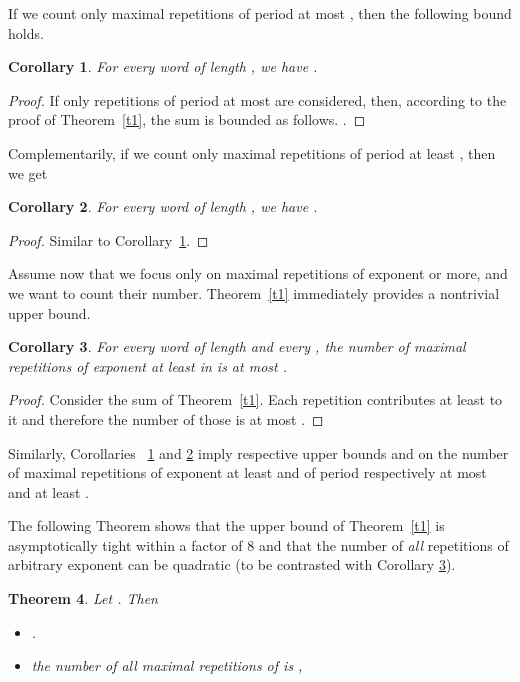\documentclass[11pt]{article}
\newtheorem{theorem}{Theorem}
\newtheorem{corollary}[theorem]{Corollary}
\begin{document}
If we count only maximal repetitions of period at most , then the
following bound holds. 
\begin{corollary}
\label{c1}
For every word  of length , we have .
\end{corollary}
\begin{proof}
If only repetitions of period at most  are considered, then,
according to the proof of Theorem~\ref{t1}, the sum is bounded as follows. .
\end{proof}

Complementarily, if we count only maximal repetitions of period at
least , then we get
\begin{corollary}
\label{c1a}
For every word  of length , we have .
\end{corollary}
\begin{proof}
Similar to 
Corollary~\ref{c1}. 
\end{proof}

Assume now that we focus only on maximal repetitions of exponent
 or more, and we want to count their number. 
Theorem~\ref{t1} immediately provides a nontrivial upper bound. 

\begin{corollary}
\label{c2}
For every word  of length  and every , the number of maximal repetitions
of exponent at least  in  is at most
. 
\end{corollary}
\begin{proof}
Consider the sum of Theorem~\ref{t1}. Each repetition contributes at
least  to it and therefore the number of those is at most . 
\end{proof}

Similarly,
Corollaries ~\ref{c1} and \ref{c1a}
imply respective upper bounds  and
 on the 
number of maximal repetitions of exponent at least 
and of period respectively at most  and at least . 

The following Theorem shows that the upper bound of Theorem~\ref{t1}
is asymptotically tight within a factor of 8 and that the number of
{\em all} repetitions of arbitrary exponent can be quadratic (to be
contrasted with Corollary \ref{c2}). 

\begin{theorem}
\label{t2}
Let . Then \begin{itemize}
\item[(i)] .
\item[(ii)] the number of all maximal repetitions of  is ,
\end{itemize}
\end{theorem}
\end{document}

